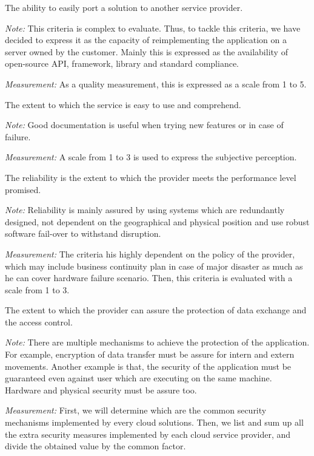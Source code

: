 \documentclass[a4paper,11pt]{article}
\begin{document}
\begin{description}[parsep=10pt,listparindent=\parindent,labelindent=\parindent,font=$\bullet$\ ]
  \item[Portability:] The ability to easily port a solution to another service provider.
    \par \emph{Note:} This criteria is complex to evaluate. Thus, to tackle this criteria, we have decided to express it as the capacity of reimplementing the application on a server owned by the customer. Mainly this is expressed as the availability of open-source API, framework, library and standard compliance.
    \par \emph{Measurement:} As a quality measurement, this is expressed as a scale from 1 to 5.

  \item[Usability:] The extent to which the service is easy to use and comprehend.
    \par \emph{Note:} Good documentation is useful when trying new features or in case of failure.
    \par \emph{Measurement:} A scale from 1 to 3 is used to express the subjective perception.

  \item[Reliability:] The reliability is the extent to which the provider meets the performance level promised.
    \par \emph{Note:} Reliability is mainly assured by using systems which are redundantly designed, not dependent on the geographical and physical position and use robust software fail-over to withstand disruption.
    \par \emph{Measurement:} The criteria his highly dependent on the policy of the provider, which may include business continuity plan in case of major disaster as much as he can cover hardware failure scenario. Then, this criteria is evaluated with a scale from 1 to 3.

  \item[Security:] The extent to which the provider can assure the protection of data exchange and the access control.
    \par \emph{Note:} There are multiple mechanisms to achieve the protection of the application. For example, encryption of data transfer must be assure for intern and extern movements. Another example is that, the security of the application must be guaranteed even against user which are executing on the same machine. Hardware and physical security must be assure too. 
    \par \emph{Measurement:} First, we will determine which are the common security mechanisms implemented by every cloud solutions. Then, we list and sum up all the extra security measures implemented by each cloud service provider, and divide the obtained value by the common factor.


\end{description}
\end{document}
